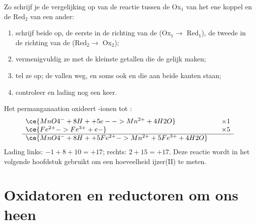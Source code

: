 \begin{method}\label{met:g11:redox:combine}
Zo schrijf je de vergelijking op van de reactie tussen de  Ox$_1$
van het ene koppel en de  Red$_2$ van een ander:
\begin{enumerate}
  \item schrijf beide  op, de eerste in de richting van de
         (Ox$_1 \to$ Red$_1$), de tweede in de richting van de
         (Red$_2 \to$ Ox$_2$);
  \item vermenigvuldig ze met de kleinste getallen die de 
        gelijk maken;
  \item tel ze op; de  vallen weg, en soms ook  en
         die aan beide kanten staan;
  \item controleer  en lading nog een keer.
\end{enumerate}
\end{method}

\begin{example}\label{ex:g11:redox:mno4-fe}
Het permanganaation oxideert -ionen tot :
\[
\begin{array}{l@{\qquad}l}
  \ce{MnO4^- + 8H+ + 5e- -> Mn^{2+} + 4H2O} & \times 1\\
  \ce{Fe^{2+} -> Fe^{3+} + e-} & \times 5\\
  \hline
  \ce{MnO4^- + 8H+ + 5Fe^{2+} -> Mn^{2+} + 5Fe^{3+} + 4H2O} &
\end{array}
\]
Lading links: $-1 + 8 + 10 = +17$; rechts: $2 + 15 = +17$. Deze reactie
wordt in het volgende hoofdstuk gebruikt om een hoeveelheid ijzer(II) te
meten.
\end{example}

\section{Oxidatoren en reductoren om ons heen}

